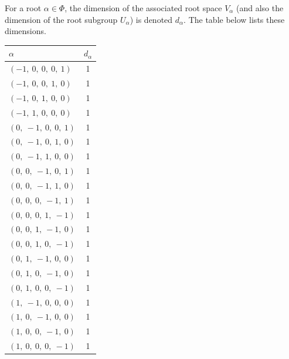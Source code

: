 \documentclass[11pt]{article}
\theoremstyle{definition}
\begin{document}
For a root $\alpha \in \Phi$, the dimension of the associated root space $V_\alpha$ (and also the dimension of the root subgroup $U_\alpha$) is denoted $d_\alpha$. The table below lists these dimensions.

\bigskip

\noindent \begin{tabular}{|l|c|}
    \hline
    \textbf{$\alpha$} & \textbf{$d_{\alpha}$} \\
    \hline
    $\left( -1, \  0, \  0, \  0, \  1\right)$ & 1 \\
    \hline
    $\left( -1, \  0, \  0, \  1, \  0\right)$ & 1 \\
    \hline
    $\left( -1, \  0, \  1, \  0, \  0\right)$ & 1 \\
    \hline
    $\left( -1, \  1, \  0, \  0, \  0\right)$ & 1 \\
    \hline
    $\left( 0, \  -1, \  0, \  0, \  1\right)$ & 1 \\
    \hline
    $\left( 0, \  -1, \  0, \  1, \  0\right)$ & 1 \\
    \hline
    $\left( 0, \  -1, \  1, \  0, \  0\right)$ & 1 \\
    \hline
    $\left( 0, \  0, \  -1, \  0, \  1\right)$ & 1 \\
    \hline
    $\left( 0, \  0, \  -1, \  1, \  0\right)$ & 1 \\
    \hline
    $\left( 0, \  0, \  0, \  -1, \  1\right)$ & 1 \\
    \hline
    $\left( 0, \  0, \  0, \  1, \  -1\right)$ & 1 \\
    \hline
    $\left( 0, \  0, \  1, \  -1, \  0\right)$ & 1 \\
    \hline
    $\left( 0, \  0, \  1, \  0, \  -1\right)$ & 1 \\
    \hline
    $\left( 0, \  1, \  -1, \  0, \  0\right)$ & 1 \\
    \hline
    $\left( 0, \  1, \  0, \  -1, \  0\right)$ & 1 \\
    \hline
    $\left( 0, \  1, \  0, \  0, \  -1\right)$ & 1 \\
    \hline
    $\left( 1, \  -1, \  0, \  0, \  0\right)$ & 1 \\
    \hline
    $\left( 1, \  0, \  -1, \  0, \  0\right)$ & 1 \\
    \hline
    $\left( 1, \  0, \  0, \  -1, \  0\right)$ & 1 \\
    \hline
    $\left( 1, \  0, \  0, \  0, \  -1\right)$ & 1 \\
    \hline
\end{tabular}
\end{document}
